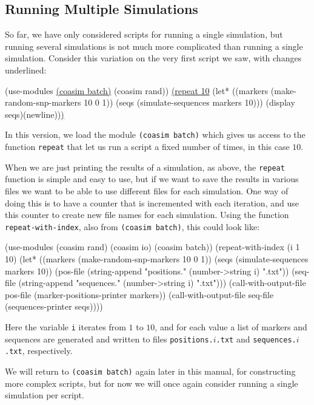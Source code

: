 \documentclass{manual}
\begin{document}
\subsection{Running Multiple Simulations}
\label{sec:runn-mult-simul}

So far, we have only considered scripts for running a single
simulation, but running several simulations is not much more
complicated than running a single simulation.  Consider this variation
on the very first script we saw, with changes underlined:
\begin{code}
(use-modules \underline{(coasim batch)} (coasim rand))
\underline{(repeat 10}
   (let* ((markers (make-random-snp-markers 10 0 1))
          (seqs (simulate-sequences markers 10)))
     (display seqs)(newline))\underline{)}
\end{code}

In this version, we load the module \texttt{(coasim batch)} which
gives us access to the function \texttt{repeat} that let us run a
script a fixed number of times, in this case $10$.

When we are just printing the results of a simulation, as above, the
\texttt{repeat} function is simple and easy to use, but if we want to
save the results in various files we want to be able to use different
files for each simulation.  One way of doing this is to have a counter
that is incremented with each iteration, and use this counter to
create new file names for each simulation.  Using the function
\texttt{repeat-with-index}, also from \texttt{(coasim batch)}, this
could look like:
\begin{code}
(use-modules (coasim rand) (coasim io) (coasim batch))
(repeat-with-index (i 1 10)
   (let* ((markers (make-random-snp-markers 10 0 1))
          (seqs (simulate-sequences markers 10))
          (pos-file (string-append "positions." (number->string i) ".txt"))
          (seq-file (string-append "sequences." (number->string i) ".txt")))
     (call-with-output-file pos-file (marker-positions-printer markers))
     (call-with-output-file seq-file (sequences-printer seqs))))
\end{code}
Here the variable \texttt{i} iterates from $1$ to $10$, and for each
value a list of markers and sequences are generated and written to
files \texttt{positions.}$i$\texttt{.txt} and
\texttt{sequences.}$i$\texttt{.txt}, respectively.

We will return to \texttt{(coasim batch)} again later in this manual,
for constructing more complex scripts, but for now we will once again
consider running a single simulation per script.
\end{document}
